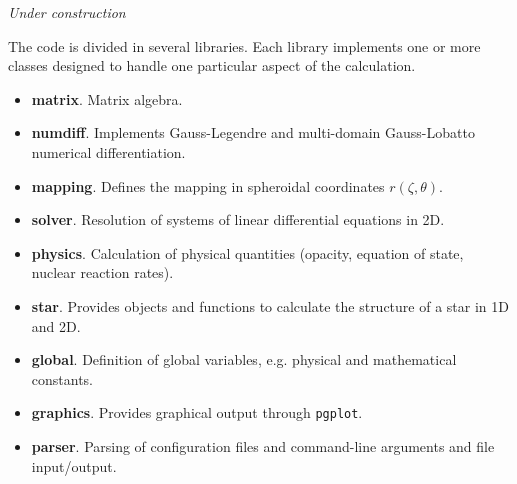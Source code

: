 {\it Under construction}

\bigskip
\bigskip
The code is divided in several libraries. Each library implements one or
more classes designed to handle one particular aspect of the calculation.

\begin{itemize}
\item {\bf matrix}. Matrix algebra.

\item {\bf numdiff}. Implements Gauss-Legendre and multi-domain
Gauss-Lobatto numerical differentiation.

\item {\bf mapping}. Defines the mapping in spheroidal coordinates
$r(\zeta,\theta)$.

\item {\bf solver}. Resolution of systems of linear differential equations
in 2D.

\item {\bf physics}. Calculation of physical quantities (opacity,
equation of state, nuclear reaction rates).

\item {\bf star}. Provides objects and functions to calculate the
structure of a star in 1D and 2D.

\item {\bf global}. Definition of global variables, e.g. physical and mathematical constants.

\item {\bf graphics}. Provides graphical output through {\tt pgplot}.
\item {\bf parser}. Parsing of configuration files and command-line
arguments and file input/output.

\end{itemize} 


